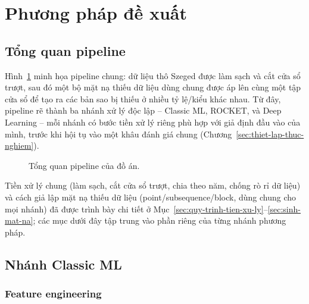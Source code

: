 \section{Phương pháp đề xuất}
\label{sec:phuong-phap-de-xuat}

\subsection{Tổng quan pipeline}
\label{sec:tong-quan-pipeline}

Hình~\ref{fig:pipeline-overview} minh họa pipeline chung: dữ liệu thô Szeged được làm
sạch và cắt cửa sổ trượt, sau đó một bộ mặt nạ thiếu dữ liệu dùng chung được áp lên cùng
một tập cửa sổ để tạo ra các bản sao bị thiếu ở nhiều tỷ lệ/kiểu khác nhau. Từ đây,
pipeline rẽ thành ba nhánh xử lý độc lập -- Classic ML, ROCKET, và Deep Learning -- mỗi
nhánh có bước tiền xử lý riêng phù hợp với giả định đầu vào của mình, trước khi hội tụ
vào một khâu đánh giá chung (Chương~\ref{sec:thiet-lap-thuc-nghiem}).

\begin{figure}[H]
\centering
{}
\caption{Tổng quan pipeline của đồ án.}
\label{fig:pipeline-overview}
\end{figure}

Tiền xử lý chung (làm sạch, cắt cửa sổ trượt, chia theo năm, chống rò rỉ dữ liệu) và cách
giả lập mặt nạ thiếu dữ liệu (point/subsequence/block, dùng chung cho mọi nhánh) đã được
trình bày chi tiết ở Mục~\ref{sec:quy-trinh-tien-xu-ly}--\ref{sec:sinh-mat-na}; các mục
dưới đây tập trung vào phần riêng của từng nhánh phương pháp.

\subsection{Nhánh Classic ML}
\label{sec:nhanh-classic-ml}

\subsubsection{Feature engineering}
\label{sec:feature-engineering}

